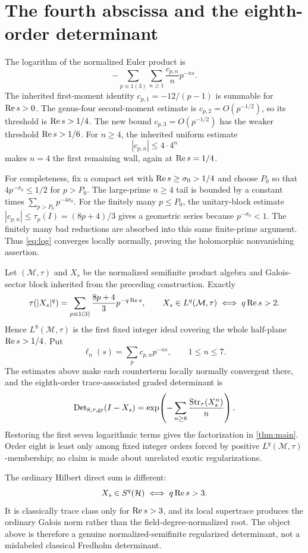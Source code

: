 \section{The fourth abscissa and the eighth-order determinant}

The logarithm of the normalized Euler product is
\begin{equation}\label{eq:log}
 -\sum_{p\equiv1(3)}\sum_{n\ge1}\frac{c_{p,n}}n p^{-ns}.
\end{equation}
The inherited first-moment identity
\(c_{p,1}=-12/(p-1)\) is summable for \(\operatorname{Re} s>0\).  The genus-four
second-moment estimate is \(c_{p,2}=O(p^{-1/2})\), so its threshold is
\(\operatorname{Re} s>1/4\).  The new bound
\(c_{p,3}=O(p^{-1/2})\) has the weaker threshold
\(\operatorname{Re} s>1/6\).  For \(n\ge4\), the inherited uniform estimate
\begin{equation}\label{eq:uniform}
 |c_{p,n}|\le4\cdot4^n
\end{equation}
makes \(n=4\) the first remaining wall, again at \(\operatorname{Re} s=1/4\).

For completeness, fix a compact set with
\(\operatorname{Re} s\ge\sigma_0>1/4\) and choose \(P_0\) so that
\(4p^{-\sigma_0}\le1/2\) for \(p>P_0\).  The large-prime \(n\ge4\)
tail is bounded by a constant times \(\sum_{p>P_0}p^{-4\sigma_0}\).
For the finitely many \(p\le P_0\), the unitary-block estimate
\(|c_{p,n}|\le\tau_p(I)=(8p+4)/3\) gives a geometric series because
\(p^{-\sigma_0}<1\).  The finitely many bad reductions are absorbed into
this same finite-prime argument.  Thus \cref{eq:log} converges locally
normally, proving the holomorphic nonvanishing assertion.

Let \((\mathcal M,\tau)\) and \(X_s\) be the normalized semifinite product
algebra and Galois-sector block inherited from the preceding construction.
Exactly
\[
 \tau(|X_s|^q)=
 \sum_{p\equiv1(3)}\frac{8p+4}{3}p^{-q\operatorname{Re} s},
 \qquad
 X_s\in L^q(\mathcal M,\tau)\iff q\operatorname{Re} s>2.
\]
Hence \(L^8(\mathcal M,\tau)\) is the first fixed integer ideal covering
the whole half-plane \(\operatorname{Re} s>1/4\).  Put
\[
 \ell_n(s)=\sum_pc_{p,n}p^{-ns},\qquad1\le n\le7.
\]
The estimates above make each counterterm locally normally convergent there,
and the eighth-order trace-associated graded determinant is
\[
 \operatorname{Det}_{8,\tau,\mathrm{gr}}(I-X_s)
 =\exp\!\left(-\sum_{n\ge8}\frac{\operatorname{Str}_\tau(X_s^n)}n\right).
\]
Restoring the first seven logarithmic terms gives the factorization in
\cref{thm:main}.  Order eight is least only among fixed integer orders forced
by positive \(L^q(\mathcal M,\tau)\)-membership; no claim is made about
unrelated exotic regularizations.

The ordinary Hilbert direct sum is different:
\[
 X_s\in S^q(\mathcal H)\iff q\operatorname{Re} s>3.
\]
It is classically trace class only for \(\operatorname{Re} s>3\), and its local
supertrace produces the ordinary Galois norm rather than the
field-degree-normalized root.  The object above is therefore a genuine
normalized-semifinite regularized determinant, not a mislabeled classical
Fredholm determinant.

